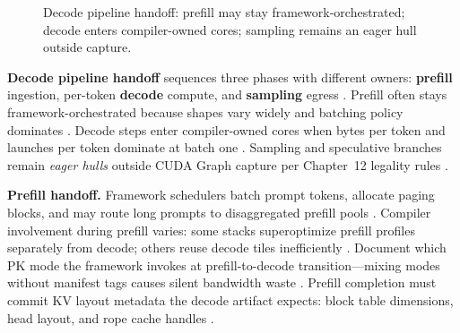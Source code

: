 \begin{figure}[t]
\centering
{}
\caption{Decode pipeline handoff: prefill may stay framework-orchestrated; decode enters compiler-owned cores; sampling remains an eager hull outside capture.}
\label{fig:decode_pipeline_handoff_architecture}
\end{figure}

\textbf{Decode pipeline handoff} sequences three phases with different owners: \textbf{prefill} ingestion, per-token \textbf{decode} compute, and \textbf{sampling} egress \citep{patel2025llminference,dao2022flashattention,dao2023flashdecoding,kwon2023vllm,taxbreak2026,memoryfloor2026,yirage2026,chen2020compilerbasedhardw,liu2024deepseekv3,nvidia2024cudagraphs,semianalysis2024tma,dlbook,amd2024xdna,amd2024aie,nvidia2022hopper}. Prefill often stays framework-orchestrated because shapes vary widely and batching policy dominates \citep{kwon2023vllm,patel2025llminference,dao2022flashattention,dao2023flashdecoding,yirage2026,chen2020compilerbasedhardw,dlbook}. Decode steps enter compiler-owned cores when bytes per token and launches per token dominate at batch one \citep{memoryfloor2026,taxbreak2026,patel2025llminference,yirage2026,chen2020compilerbasedhardw,dao2022flashattention,dlbook}. Sampling and speculative branches remain \emph{eager hulls} outside CUDA Graph capture per Chapter~12 legality rules \citep{nvidia2024cudagraphs,kwon2023vllm,patel2025llminference,yirage2026,chen2020compilerbasedhardw,taxbreak2026,memoryfloor2026,dlbook}.

\textbf{Prefill handoff.} Framework schedulers batch prompt tokens, allocate paging blocks, and may route long prompts to disaggregated prefill pools \citep{kwon2023vllm,liu2024deepseekv3,patel2025llminference,yirage2026,chen2020compilerbasedhardw,dlbook}. Compiler involvement during prefill varies: some stacks superoptimize prefill profiles separately from decode; others reuse decode tiles inefficiently \citep{yirage2026,chen2020compilerbasedhardw,patel2025llminference,dao2022flashattention,dao2023flashdecoding,dlbook}. Document which PK mode the framework invokes at prefill-to-decode transition---mixing modes without manifest tags causes silent bandwidth waste \citep{yirage2026,chen2020compilerbasedhardw,patel2025llminference,kwon2023vllm,memoryfloor2026,taxbreak2026,dlbook}. Prefill completion must commit KV layout metadata the decode artifact expects: block table dimensions, head layout, and rope cache handles \citep{kwon2023vllm,dao2022flashattention,yirage2026,chen2020compilerbasedhardw,patel2025llminference,dlbook}.

